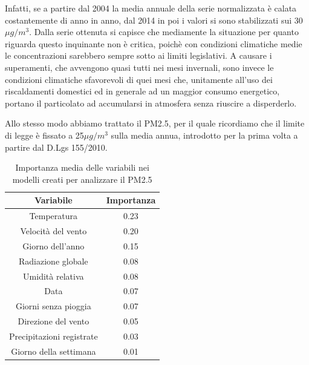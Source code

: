 \documentclass[a4paper,12pt]{report}
\begin{document}

Infatti, se a partire dal 2004 la media annuale della serie normalizzata è calata costantemente di anno in anno, dal 2014 in poi i valori si sono stabilizzati sui 30$\mu g/m^3$. Dalla serie ottenuta si capisce che mediamente la situazione per quanto riguarda questo inquinante non è critica, poichè con condizioni climatiche medie le concentrazioni sarebbero sempre sotto ai limiti legislativi. A causare i superamenti, che avvengono quasi tutti nei mesi invernali, sono invece le condizioni climatiche sfavorevoli di quei mesi che, unitamente all'uso dei riscaldamenti domestici ed in generale ad un maggior consumo energetico, portano il particolato ad accumularsi in atmosfera senza riuscire a disperderlo.


Allo stesso modo abbiamo trattato il PM2.5, per il quale ricordiamo che il limite di legge è fissato a 25$\mu g/m^3$ sulla media annua, introdotto per la prima volta a partire dal D.Lgs 155/2010.

\begin{table}[h!]
\centering
\begin{tabular}{ |c c| }
	\hline
	Variabile & Importanza \\
	\hline
	Temperatura & 0.23 \\
	Velocità del vento & 0.20 \\
	Giorno dell'anno & 0.15 \\
	Radiazione globale & 0.08 \\
	Umidità relativa & 0.08 \\
	Data & 0.07 \\
	Giorni senza pioggia & 0.07 \\
	Direzione del vento & 0.05 \\
	Precipitazioni registrate & 0.03 \\
	Giorno della settimana & 0.01 \\
	\hline
\end{tabular}
\caption{Importanza media delle variabili nei modelli creati per analizzare il PM2.5}
\label{table:importanza_pm25}
\end{table}
\end{document}
